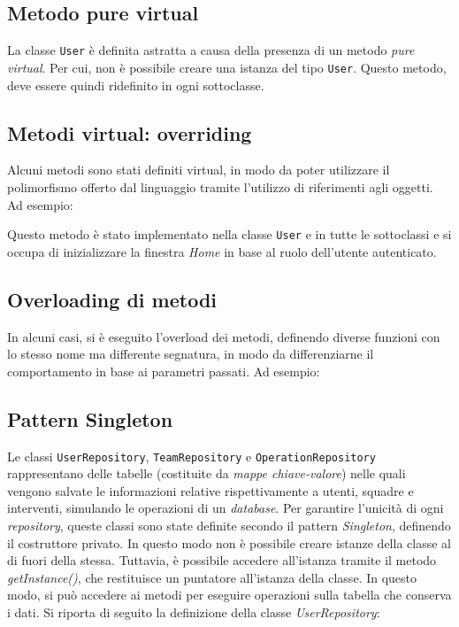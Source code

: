 \subsection{Metodo pure virtual}
La classe \texttt{User} è definita astratta a causa della presenza di un metodo \textit{pure virtual}. Per cui, non è possibile creare una istanza del tipo \texttt{User}. Questo metodo, deve essere quindi ridefinito in ogni sottoclasse.


\subsection{Metodi virtual: overriding}
Alcuni metodi sono stati definiti virtual, in modo da poter utilizzare il polimorfismo offerto dal linguaggio tramite l'utilizzo di riferimenti agli oggetti. Ad esempio:

Questo metodo è stato implementato nella classe \texttt{User} e in tutte le sottoclassi e si occupa di inizializzare la finestra \textit{Home} in base al ruolo dell'utente autenticato.

\subsection{Overloading di metodi}
In alcuni casi, si è eseguito l'overload dei metodi, definendo diverse funzioni con lo stesso nome ma differente segnatura, in modo da differenziarne il comportamento in base ai parametri passati. Ad esempio:


\subsection{Pattern Singleton}\label{sec:singleton}
Le classi \texttt{UserRepository}, \texttt{TeamRepository} e \texttt{OperationRepository} rappresentano delle tabelle (costituite da \textit{mappe chiave-valore}) nelle quali vengono salvate le informazioni relative rispettivamente a utenti, squadre e interventi, simulando le operazioni di un \textit{database}. Per garantire l'unicità di ogni \textit{repository}, queste classi sono state definite secondo il pattern \textit{Singleton}, definendo il costruttore privato. In questo modo non è possibile creare istanze della classe al di fuori della stessa. Tuttavia, è possibile accedere all'istanza tramite il metodo \textit{getInstance()}, che restituisce un puntatore all'istanza della classe. In questo modo, si può accedere ai metodi per eseguire operazioni sulla tabella che conserva i dati. Si riporta di seguito la definizione della classe \textit{UserRepository}:


